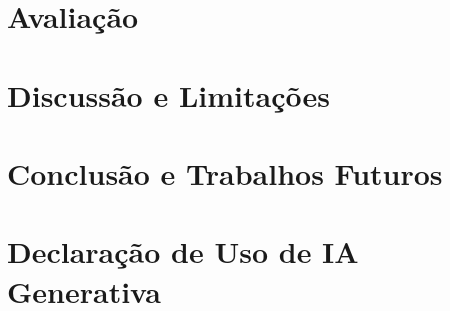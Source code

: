 \documentclass[12pt]{article}
\begin{document}
\section{Avaliação}
\label{sec:avaliacao}


\section{Discussão e Limitações}
\label{sec:discussao}


\section{Conclusão e Trabalhos Futuros}
\label{sec:conclusao}


\section*{Declaração de Uso de IA Generativa}
\label{sec:declaracao-ia}




\end{document}
